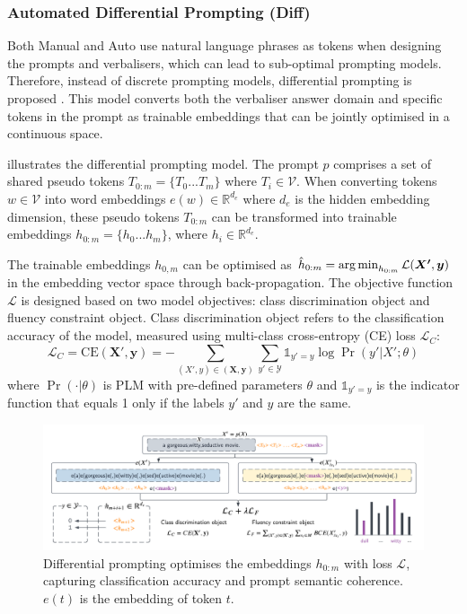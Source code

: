 \vspace{-0.5em}
\subsubsection{Automated Differential Prompting (Diff)}
Both Manual and Auto use natural language phrases as tokens when designing the prompts and verbalisers, which can lead to sub-optimal prompting models. Therefore, instead of discrete prompting models, differential prompting is proposed \cite{zhang2021differentiable}. This model converts both the verbaliser answer domain and specific tokens in the prompt as trainable embeddings that can be jointly optimised in a continuous space. 

 illustrates the differential prompting model. The prompt $p$ comprises a set of shared pseudo tokens $T_{0:m} = \{T_0...T_m\}$ where $T_i \in \mathcal{V}$. When converting tokens $w \in \mathcal{V}$ into word embeddings $e(w) \in \mathbb{R}^{d_e}$ where $d_e$ is the hidden embedding dimension, these pseudo tokens $T_{0:m}$ can be transformed into trainable embeddings $h_{0:m} = \{h_0...h_m\}$, where $h_i \in \mathbb{R}^{d_e}$. 

The trainable embeddings $h_{0,m}$ can be optimised as $\hat{h}_{0:m} = \operatorname*{arg\,min}_{h_{0:m}} \mathcal{L}(\boldsymbol{X'}, \boldsymbol{y})$ in the embedding vector space through back-propagation. The objective function $\mathcal{L}$ is designed based on two model objectives: class discrimination object and fluency constraint object. Class discrimination object refers to the classification accuracy of the model, measured using multi-class cross-entropy (CE) loss $\mathcal{L}_C$:
\begin{equation}
    \label{equation:class_disc}
    \mathcal{L}_C = \text{CE}(\boldsymbol{X}
', \boldsymbol{y}) = - \sum_{(X', y) \in (\boldsymbol{X}, \boldsymbol{y})}\sum_{y' \in \mathcal{Y}} \mathds{1}_{y' = y} \log \Pr(y'|X'; \theta)
\end{equation}
where $\Pr(\cdot|\theta)$ is PLM with pre-defined parameters $\theta$ and $\mathds{1}_{y'=y}$ is the indicator function that equals 1 only if the labels $y'$ and $y$ are the same.

\vspace{-0.5em}
\begin{figure}[!ht]
    \centering
    \includegraphics[width=\hsize]{figures/preparation_media/prepare-diff.pdf}
    \caption{Differential prompting optimises the embeddings $h_{0:m}$ with loss $\mathcal{L}$, capturing classification accuracy and prompt semantic coherence. $e(t)$ is the embedding of token $t$.}
    \label{fig:prepare-diff}
\end{figure}

